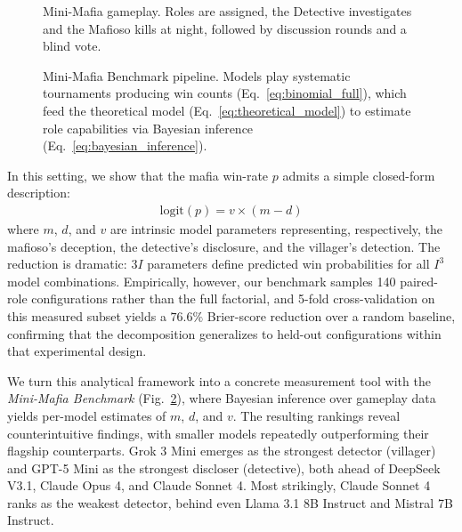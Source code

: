 \documentclass[sigconf]{aamas}
\begin{document}
\begin{figure}[t!]
    \centering
    \resizebox{\linewidth}{!}{%
    }
    \caption{Mini-Mafia gameplay. Roles are assigned, the Detective investigates and the Mafioso kills at night, followed by discussion rounds and a blind vote.}
    \label{fig:mini-mafia-gameplay}
\end{figure}

\begin{figure}[t!]
    \centering
    \resizebox{\linewidth}{!}{%
    }
    \caption{Mini-Mafia Benchmark pipeline. Models play systematic tournaments producing win counts (Eq.~\ref{eq:binomial_full}), which feed the theoretical model (Eq.~\ref{eq:theoretical_model}) to estimate role capabilities via Bayesian inference (Eq.~\ref{eq:bayesian_inference}).}
    \label{fig:mini-mafia-benchmark}
\end{figure}


In this setting, we show that the mafia win-rate $p$ admits a simple closed-form description:
\begin{align}
    \text{logit}(p) = v \times (m - d)
\end{align}
where $m$, $d$, and $v$ are intrinsic model parameters representing, respectively, the mafioso's deception, the detective's disclosure, and the villager's detection. The reduction is dramatic: $3I$ parameters define predicted win probabilities for all $I^3$ model combinations. Empirically, however, our benchmark samples 140 paired-role configurations rather than the full factorial, and 5-fold cross-validation on this measured subset yields a $76.6\%$ Brier-score reduction over a random baseline, confirming that the decomposition generalizes to held-out configurations within that experimental design.

We turn this analytical framework into a concrete measurement tool with the \textit{Mini-Mafia Benchmark} (Fig.~\ref{fig:mini-mafia-benchmark}), where Bayesian inference over gameplay data yields per-model estimates of $m$, $d$, and $v$. The resulting rankings reveal counterintuitive findings, with smaller models repeatedly outperforming their flagship counterparts. Grok 3 Mini emerges as the strongest detector (villager) and GPT-5 Mini as the strongest discloser (detective), both ahead of DeepSeek V3.1, Claude Opus 4, and Claude Sonnet 4. Most strikingly, Claude Sonnet 4 ranks as the weakest detector, behind even Llama 3.1 8B Instruct and Mistral 7B Instruct.
\end{document}
